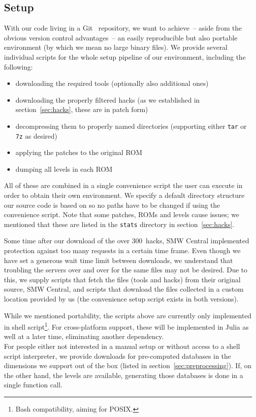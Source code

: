 \subsection{Setup}

With our code living in a Git~\cite{Git} repository, we want to
achieve~-- aside from the obvious version control advantages~-- an
easily reproducible but also portable environment (by which we mean no
large binary files). We provide several individual scripts for the
whole setup pipeline of our environment, including the following:
\begin{itemize}
\item downloading the required tools (optionally also additional ones)
\item downloading the properly filtered hacks (as we established in
  section~\ref{sec:hacks}, these are in patch form)
\item decompressing them to properly named directories (supporting
  either \texttt{tar} or \texttt{7z} as desired)
\item applying the patches to the original ROM
\item dumping all levels in each ROM
\end{itemize}
All of these are combined in a single convenience script the user can
execute in order to obtain their own environment. We specify a default
directory structure our source code is based on so no paths have to be
changed if using the convenience script. Note that some patches, ROMs
and levels cause issues; we mentioned that these are listed in the
\texttt{stats} directory in section~\ref{sec:hacks}.

Some time after our download of the over 300~hacks, SMW Central
implemented protection against too many requests in a certain time
frame. Even though we have set a generous wait time limit between
downloads, we understand that troubling the servers over and over for
the same files may not be desired. Due to this, we supply scripts that
fetch the files (tools and hacks) from their original source, SMW
Central, and scripts that download the files collected in a custom
location provided by us (the convenience setup script exists in both
versions).

While we mentioned portability, the scripts above are currently only
implemented in shell script\footnote{Bash compatibility, aiming for
  POSIX.}. For cross-platform support, these will be implemented in
Julia as well at a later time, eliminating another dependency. \\
For people either not interested in a manual setup or without access
to a shell script interpreter, we provide downloads for pre-computed
databases in the dimensions we support out of the box (listed in
section~\ref{sec:preprocessing}). If, on the other hand, the levels
are available, generating those databases is done in a single function
call.

